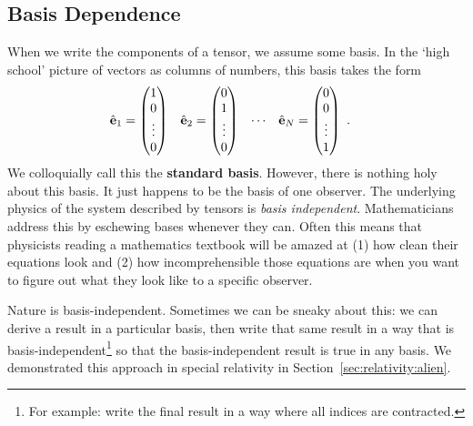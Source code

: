 \documentclass[12pt]{article}
\begin{document}
\subsection{Basis Dependence}

When we write the components of a tensor, we assume some basis. In the `high school' picture of vectors as columns of numbers, this basis takes the form
\begin{align}
    \hat{\mathbf{e}}_1 &= 
    \begin{pmatrix}
        1 \\ 0 \\ \vdots \\ 0
    \end{pmatrix}
    &
    \hat{\mathbf{e}}_2 &= 
    \begin{pmatrix}
        0 \\ 1 \\ \vdots \\ 0
    \end{pmatrix}
    & \cdots &
    &
    \hat{\mathbf{e}}_N &= 
    \begin{pmatrix}
        0 \\ 0 \\ \vdots \\ 1
    \end{pmatrix} \ .
\end{align}
We colloquially call this the \textbf{standard basis}.
However, there is nothing holy about this basis. It just happens to be the basis of one observer. The underlying physics of the system described by tensors is \emph{basis independent}. Mathematicians address this by eschewing bases whenever they can. Often this means that physicists reading a mathematics textbook will be amazed at (1) how clean their equations look and (2) how incomprehensible those equations are when you want to figure out what they look like to a specific observer. 

Nature is basis-independent. Sometimes we can be sneaky about this: we can derive a result in a particular basis, then write that same result in a way that is basis-independent\footnote{For example: write the final result in a way where all indices are contracted.} so that the basis-independent result is true in any basis. We demonstrated this approach in special relativity in Section~\ref{sec:relativity:alien}. 
\end{document}
